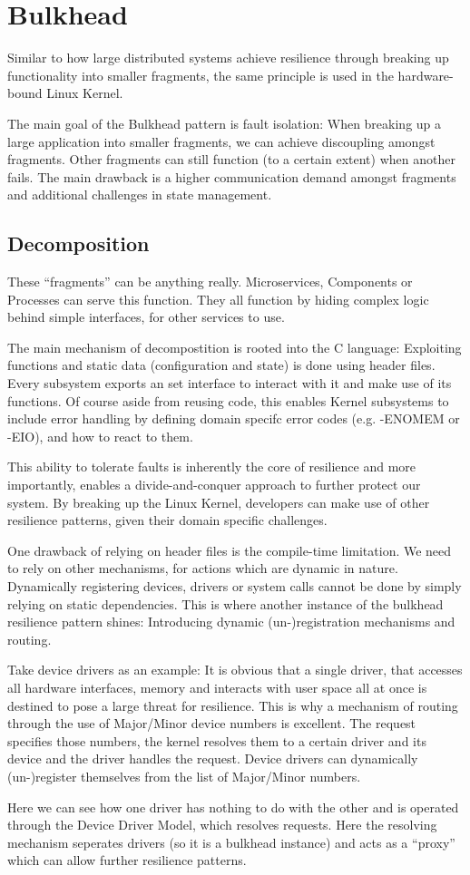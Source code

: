 \chapter{Bulkhead}
Similar to how large distributed systems achieve resilience through breaking up functionality into smaller fragments, the same principle is used in the hardware-bound Linux Kernel. 

The main goal of the Bulkhead pattern is fault isolation: When breaking up a large application into smaller fragments, we can achieve discoupling amongst fragments. Other fragments can still function (to a certain extent) when another fails. The main drawback is a higher communication demand amongst fragments and additional challenges in state management.\cite{bulkhead}



\section{Decomposition}
These \enquote{fragments} can be anything really. Microservices, Components or Processes can serve this function. They all function by hiding complex logic behind simple interfaces, for other services to use. 

The main mechanism of decompostition is rooted into the C language: Exploiting functions and static data (configuration and state) is done using header files. Every subsystem exports an set interface to interact with it and make use of its functions. Of course aside from reusing code, this enables Kernel subsystems to include error handling by defining domain specifc error codes (e.g. -ENOMEM or -EIO), and how to react to them.

This ability to tolerate faults is inherently the core of resilience and more importantly, enables a divide-and-conquer approach to further protect our system. By breaking up the Linux Kernel, developers can make use of other resilience patterns, given their domain specific challenges.

One drawback of relying on header files is the compile-time limitation. We need to rely on other mechanisms, for actions which are dynamic in nature. Dynamically registering devices, drivers or system calls cannot be done by simply relying on static dependencies. This is where another instance of the bulkhead resilience pattern shines: Introducing dynamic (un-)registration mechanisms and routing.

Take device drivers as an example: It is obvious that a single driver, that accesses all hardware interfaces, memory and interacts with user space all at once is destined to pose a large threat for resilience. This is why a mechanism of routing through the use of Major/Minor device numbers is excellent. The request specifies those numbers, the kernel resolves them to a certain driver and its device and the driver handles the request. Device drivers can dynamically (un-)register themselves from the list of Major/Minor numbers. \cite[ch. 3]{Corbet2005}


Here we can see how one driver has nothing to do with the other and is operated through the Device Driver Model, which resolves requests. 
Here the resolving mechanism seperates drivers (so it is a bulkhead instance) and acts as a \enquote{proxy} which can allow further resilience patterns.
